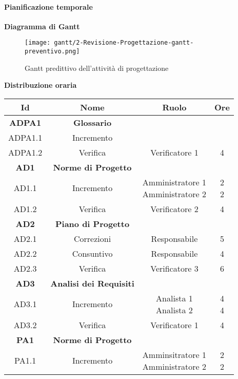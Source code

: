 \documentclass{scalatekids-article}
\begin{document}
\newpage
\paragraph{Pianificazione temporale}
\textbf{Diagramma di Gantt}
\begin{figure}[H]
  \texttt{[image: gantt/2-Revisione-Progettazione-gantt-preventivo.png]}
  \caption{Gantt predittivo dell'attività di progettazione}
\end{figure}

\newpage
\textbf{Distribuzione oraria}
\scriptsize
\begin{center}
  \begin{tabular}{| c | c | c | c |}
    \hline
    \textbf{Id} & \textbf{Nome} & \textbf{Ruolo} & \textbf{Ore}\\
    \hline
    \textbf{ADPA1} & \textbf{Glossario} & &\\
    \hline
    ADPA1.1 & Incremento &  &\\
    \hline
    ADPA1.2 & Verifica & Verificatore 1 & 4\\
    \hline
    \textbf{AD1} & \textbf{Norme di Progetto} & &\\
    \hline
    AD1.1 & Incremento & \multiLineCell[t]{Amministratore 1\\Amministratore 2} & \multiLineCell[t]{2\\2}\\
    \hline
    AD1.2 & Verifica & Verificatore 2 & 4\\
    \hline
    \textbf{AD2} & \textbf{Piano di Progetto} & &\\
    \hline
    AD2.1 & Correzioni & Responsabile & 5\\
    \hline
    AD2.2 & Consuntivo & Responsabile & 4\\
    \hline
    AD2.3 & Verifica & Verificatore 3 & 6\\
    \hline
    \textbf{AD3} & \textbf{Analisi dei Requisiti} & &\\
    \hline
    AD3.1 & Incremento & \multiLineCell[t]{Analista 1\\Analista 2} & \multiLineCell[t]{4\\4}\\
    \hline
    AD3.2 & Verifica & Verificatore 1 & 4\\
    \hline
    \textbf{PA1} & \textbf{Norme di Progetto} & &\\
    \hline
    PA1.1 & Incremento & \multiLineCell[t]{Amminsitratore 1\\Amministratore 2} & \multiLineCell[t]{2\\2}\\

\end{tabular}
\end{center}
\end{document}
